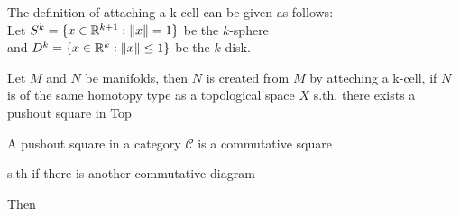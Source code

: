 \documentclass[a4paper,11pt]{article}
\begin{document}
The definition of attaching a k-cell can be given as follows: \\
Let $S^k = \{x \in {\mathbb R}^{k+1} : \lVert x \rVert = 1\}$ be the $k$-sphere \\
and $D^k = \{ x \in {\mathbb R}^k : \lVert x \rVert \leq 1 \}$ be the $k$-disk.

Let $M$ and $N$ be manifolds, then $N$ is created from $M$ by atteching a k-cell,
if $N$ is of the same homotopy type as a topological space $X$ s.th. there exists 
a pushout square in Top

\begin{figure}[H]
   \centering
\end{figure}

A pushout square in a category $\mathcal{C}$ is a commutative square 

\begin{figure}[H]
   \centering
\end{figure}      
   
s.th if there is another commutative diagram

\begin{figure}[H]
   \centering
\end{figure}

Then 

\begin{figure}[H]
   \centering
\end{figure}
\end{document}
